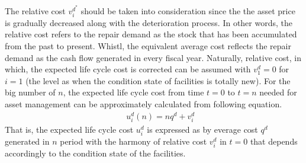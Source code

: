 The relative cost  $v_i^{d^\ast} $ should be taken into consideration since the the asset price is gradually decreased along with the deterioration process. In other words, the relative cost refers to the repair demand as the stock that has been accumulated from the past to present. Whistl, the equivalent average cost reflects the repair demand as the cash flow generated in every fiscal year. Naturally, relative cost, in which, the expected life cycle cost is corrected can be assumed with $v_1^d=0$ for $i=1$ (the level as when the condition state of facilities is totally new). For the big number of $n$, the expected life cycle cost from time  $t=0$ to $t=n$ needed for asset management can be approximately calculated from following equation.
\begin{eqnarray}
&& u_i^d(n)=nq^d+v_i^d \label{kta}
\end{eqnarray}
That is, the expected life cycle cost $u_i^d$ is expressed as by everage cost $q^d$ generated in $n$ period with the harmony of relative cost $v_i^d$ in $t=0$ that depends accordingly to the condition state of the facilities.
